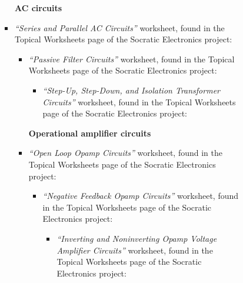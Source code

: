 \begin{itemize}
\begin{itemize}
\begin{itemize}
\begin{itemize}
\begin{itemize}
\begin{itemize}
\begin{itemize}
\end{itemize}
\end{itemize}




\vskip 20pt

\noindent
{\bf AC circuits}

\item{} {\it ``Series and Parallel AC Circuits''} worksheet, found in the Topical Worksheets page of the Socratic Electronics project:
\begin{itemize}

\vskip 5pt
\item{} {\it ``Passive Filter Circuits''} worksheet, found in the Topical Worksheets page of the Socratic Electronics project:
\begin{itemize}

\vskip 5pt
\item{} {\it ``Step-Up, Step-Down, and Isolation Transformer Circuits''} worksheet, found in the Topical Worksheets page of the Socratic Electronics project:
\begin{itemize}

\end{itemize}
\end{itemize}




\vskip 20pt

\noindent
{\bf Operational amplifier circuits}

\item{} {\it ``Open Loop Opamp Circuits''} worksheet, found in the Topical Worksheets page of the Socratic Electronics project:
\begin{itemize}

\vskip 5pt
\item{} {\it ``Negative Feedback Opamp Circuits''} worksheet, found in the Topical Worksheets page of the Socratic Electronics project:
\begin{itemize}

\vskip 5pt
\item{} {\it ``Inverting and Noninverting Opamp Voltage Amplifier Circuits''} worksheet, found in the Topical Worksheets page of the Socratic Electronics project:
\begin{itemize}

\end{itemize}
\end{itemize}





\end{itemize}
\end{itemize}
\end{itemize}
\end{itemize}
\end{itemize}
\end{itemize}
\end{itemize}
